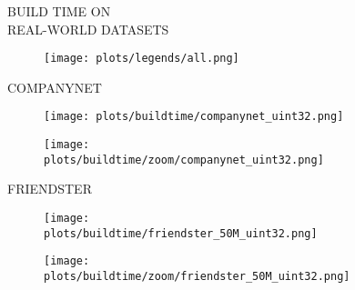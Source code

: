 \documentclass{article}
\begin{document}
\begin{figure}[!htbp]
\fbox
{
\begin{minipage}[t][0.98\textheight][t]{\textwidth}
\centering
\vspace*{-5px}
    \begin{minipage}{0.2\linewidth}
    \footnotesize{BUILD TIME ON \\ REAL-WORLD DATASETS}
    \end{minipage}
   \begin{minipage}{0.75\linewidth}
        \begin{figure}[H]
        \texttt{[image: plots/legends/all.png]}
        \end{figure}
    \end{minipage}
    \vspace*{-14px}
    
    \begin{minipage}{0.03\linewidth}
    \begin{sideways}\small COMPANYNET\end{sideways}
    \end{minipage}
    \begin{minipage}{0.38\linewidth}
        \begin{figure}[H]
        \texttt{[image: plots/buildtime/companynet\_uint32.png]}
        \end{figure}
    \end{minipage}
    \begin{minipage}{0.38\linewidth}
        \begin{figure}[H]
            \texttt{[image: plots/buildtime/zoom/companynet\_uint32.png]}
        \end{figure}
    \end{minipage}
\vspace*{-0.6cm}

\begin{minipage}{0.03\linewidth}
    \begin{sideways}\small FRIENDSTER\end{sideways}
    \end{minipage}
    \begin{minipage}{0.38\linewidth}
        \begin{figure}[H]
        \texttt{[image: plots/buildtime/friendster\_50M\_uint32.png]}
        \end{figure}
    \end{minipage}
    \begin{minipage}{0.38\linewidth}
        \begin{figure}[H]
            \texttt{[image: plots/buildtime/zoom/friendster\_50M\_uint32.png]}
        \end{figure}
    \end{minipage}
\vspace*{-0.6cm}


\end{minipage}}
\end{figure}
\end{document}
